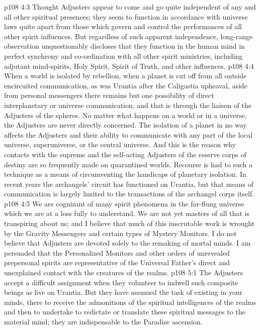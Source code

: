 \vs p108 4:3 Thought Adjusters appear to come and go quite independent of any and all other spiritual presences; they seem to function in accordance with universe laws quite apart from those which govern and control the performances of all other spirit influences. But regardless of such apparent independence, long\hyp{}range observation unquestionably discloses that they function in the human mind in perfect synchrony and co\hyp{}ordination with all other spirit ministries, including adjutant mind\hyp{}spirits, Holy Spirit, Spirit of Truth, and other influences.
\vs p108 4:4 When a world is isolated by rebellion, when a planet is cut off from all outside encircuited communication, as was Urantia after the Caligastia upheaval, aside from personal messengers there remains but one possibility of direct interplanetary or universe communication, and that is through the liaison of the Adjusters of the spheres. No matter what happens on a world or in a universe, the Adjusters are never directly concerned. The isolation of a planet in no way affects the Adjusters and their ability to communicate with any part of the local universe, superuniverse, or the central universe. And this is the reason why contacts with the supreme and the self\hyp{}acting Adjusters of the reserve corps of destiny are so frequently made on quarantined worlds. Recourse is had to such a technique as a means of circumventing the handicaps of planetary isolation. In recent years the archangels’ circuit has functioned on Urantia, but that means of communication is largely limited to the transactions of the archangel corps itself.
\vs p108 4:5 \pc We are cognizant of many spirit phenomena in the far\hyp{}flung universe which we are at a loss fully to understand. We are not yet masters of all that is transpiring about us; and I believe that much of this inscrutable work is wrought by the Gravity Messengers and certain types of Mystery Monitors. I do not believe that Adjusters are devoted solely to the remaking of mortal minds. I am persuaded that the Personalized Monitors and other orders of unrevealed prepersonal spirits are representative of the Universal Father’s direct and unexplained contact with the creatures of the realms.
\vs p108 5:1 The Adjusters accept a difficult assignment when they volunteer to indwell such composite beings as live on Urantia. But they have assumed the task of existing in your minds, there to receive the admonitions of the spiritual intelligences of the realms and then to undertake to redictate or translate these spiritual messages to the material mind; they are indispensable to the Paradise ascension.
